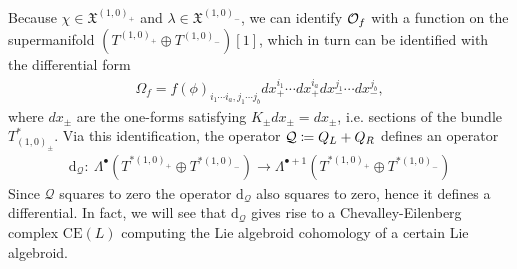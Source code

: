 \documentclass{article}
\newcommand{\XX}{\mathfrak{X}}
\newcommand{\QQ}{\mathcal{Q}}
\newcommand{\rd}{\mathrm{d}}
\theoremstyle{definition}
\theoremstyle{remark}
\begin{document}
Because $\chi \in \XX^{(1,0)_+}$ and $\lambda \in \XX^{(1,0)_-}$, we can identify ${\cal O}_f$ with a function on the supermanifold $(T^{(1,0)_+}\oplus T^{(1,0)_-})[1]$, which in turn can be identified with the differential form
\begin{align*}
\Omega_f=f(\phi)_{i_1\cdots i_a,j_1\cdots j_b}dx^{i_1}_+\cdots dx^{i_a}_+ dx^{j_1}_- \cdots dx^{j_b}_-,
\end{align*}
where $dx_\pm$ are the one-forms satisfying $K_\pm dx_\pm=dx_\pm$, i.e. sections of the bundle $T^*_{(1,0)_\pm}$. Via this identification, the operator ${\cal Q}\coloneqq Q_L+Q_R$ defines an operator
\begin{align*}
\rd_\QQ:\ \Lambda^\bullet(T^{*(1,0)_+}\oplus T^{*(1,0)_-})\rightarrow \Lambda^{\bullet +1}(T^{*(1,0)_+}\oplus T^{*(1,0)_-})
\end{align*}
Since $\QQ$ squares to zero the operator $\rd_\QQ$ also squares to zero, hence it defines a differential. 
In fact, we will see that $\rd_\QQ$ gives rise to a Chevalley-Eilenberg complex $\text{CE}(L)$ computing the Lie algebroid cohomology of a certain Lie algebroid.
\end{document}
